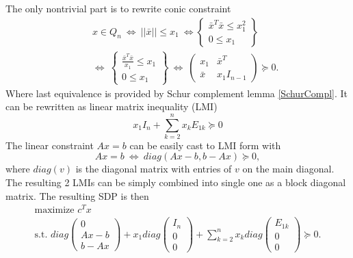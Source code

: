 \documentclass[10pt,oneside]{book}
\theoremstyle{definition}
\begin{document}
The only nontrivial part is to rewrite conic constraint 
\begin{eqnarray}
& &x\in Q_n \ \Leftrightarrow  \ ||\bar{x}||\leq x_1 \ \Leftrightarrow  
\left\lbrace \begin{array}{r}
\bar{x}^T\bar{x}\leq x_1^2\\
0\leq x_1 
\end{array}\right\rbrace \\
 & &\Leftrightarrow \ 
 \left\lbrace \begin{array}{r}
\frac{\bar{x}^T\bar{x}}{x_1}\leq x_1\\
0\leq x_1 
\end{array}\right\rbrace 
 \ \Leftrightarrow  \ 
 \left( \begin{array}{cc}
x_1 & \bar{x}^T\\
\bar{x} & x_1I_{n-1}
\end{array}\right)\succeq 0.
\label{arrowx}
\end{eqnarray}
Where last equivalence is provided by Schur complement lemma \ref{SchurCompl}.
It can be rewritten as linear matrix inequality (LMI)
\begin{equation}
x_1I_n + \sum_{k=2}^n x_kE_{1k} \succeq 0
\end{equation}
The linear constraint $Ax = b$ can be easily cast to LMI form with
\begin{equation}
Ax=b \ \Leftrightarrow \ diag(Ax-b,b-Ax)\succeq 0,
\end{equation}
where $diag(v)$ is the diagonal matrix with entries of $v$ on the main diagonal.
The resulting 2 LMIs can be simply combined into single one as a block diagonal matrix. The resulting SDP is then
\begin{equation} 
\begin{array}{l}
\mbox{maximize \ }  c^Tx \\
\mbox{s.t. \ }
 diag\left(\begin{array}{c} 0 \\ Ax-b \\b-Ax  \end{array}\right) 
 +  x_1diag\left(\begin{array}{c} I_n \\ 0 \\0  \end{array}\right)
 + \sum_{k=2}^n x_kdiag\left(\begin{array}{c} E_{1k} \\0 \\0  \end{array}\right)\succeq 0.
 \end{array}	
\end{equation}  
\end{document}
